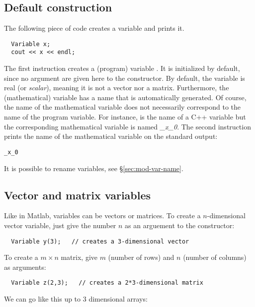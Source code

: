 \subsection{Default construction}

The following piece of code creates a variable  and prints it.

\begin{lstlisting}
  Variable x;
  cout << x << endl;
\end{lstlisting}

The first instruction creates a (program) variable . It is initialized by default, since
no argument are given here to the constructor.
By default, the variable is real (or {\it scalar}), meaning it is not a vector nor a matrix. 
Furthermore, the (mathematical) variable has a name that is automatically
generated. Of course, the name of the mathematical variable does not necessarily correspond to the name of the 
program variable.
For instance,  is the name of a C++ variable but the corresponding 
mathematical variable is named {\it \_x\_0}.
The second instruction prints the name of the mathematical variable on the standard output:

\begin{lstlisting}
_x_0
\end{lstlisting}

It is possible to rename variables, see \S\ref{sec:mod-var-name}.

\subsection{Vector and matrix variables}\label{sec:mod-var-vec}

Like in Matlab, variables can be vectors or matrices. To create a $n$-dimensional vector variable, just
give the number $n$ as an arguement to the constructor:

\begin{lstlisting}
  Variable y(3);   // creates a 3-dimensional vector
\end{lstlisting}

To create a $m\times n$ matrix, give $m$ (number of rows) and $n$ (number of columns) as arguments:

\begin{lstlisting}
  Variable z(2,3);   // creates a 2*3-dimensional matrix
\end{lstlisting}

We can go like this up to 3 dimensional arrays:

